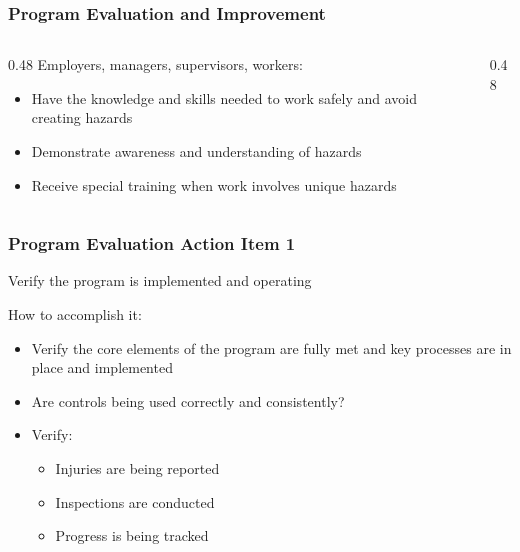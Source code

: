 \begin{frame}
	\frametitle{Program Evaluation and Improvement}

    \begin{columns}
        \begin{column}{0.48\linewidth}
            Employers, managers, supervisors, workers:
            \begin{itemize}[<+- | alert@+>]
                \item Have the knowledge and skills needed to work safely and avoid creating hazards
                \item Demonstrate awareness and understanding of hazards
                \item Receive special training when work involves unique hazards
            \end{itemize}
        \end{column}
        \begin{column}{0.48\linewidth}
        \end{column}
    \end{columns}
\end{frame}

\begin{frame}
	\frametitle{Program Evaluation Action Item 1}

    Verify the program is implemented and operating

    \begin{block}{How to accomplish it:}
        \begin{itemize}[<+- | alert@+>]
            \item Verify the core elements of the program are fully met and key processes are in place and implemented
            \item Are controls being used correctly and consistently?
            \item Verify:
                \begin{itemize}[<+- | alert@+>]
                    \item Injuries are being reported
                    \item Inspections are conducted
                    \item Progress is being tracked
                \end{itemize}
        \end{itemize}
    \end{block}
\end{frame}

